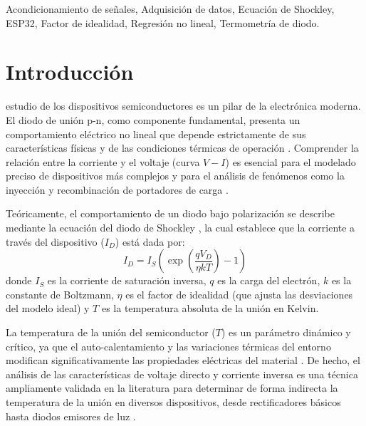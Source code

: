 \documentclass[conference]{IEEEtran}
\begin{document}
\renewcommand\IEEEkeywordsname{Palabras clave}\begin{keywords}
Acondicionamiento de señales, Adquisición de datos, Ecuación de Shockley, ESP32, Factor de idealidad, Regresión no lineal, Termometría de diodo.
\end{keywords}

\section{Introducción}
\label{sec:introduccion}

 estudio de los dispositivos semiconductores es un pilar de la electrónica moderna. El diodo de unión p-n, como componente fundamental, presenta un comportamiento eléctrico no lineal que depende estrictamente de sus características físicas y de las condiciones térmicas de operación \cite{boylestad_dispositivos, neamen_fisica_semiconductores}. Comprender la relación entre la corriente y el voltaje (curva $V-I$) es esencial para el modelado preciso de dispositivos más complejos y para el análisis de fenómenos como la inyección y recombinación de portadores de carga \cite{karg1997light, wilson1970comparison}.

Teóricamente, el comportamiento de un diodo bajo polarización se describe mediante la ecuación del diodo de Shockley \cite{vliet1980shockley, musolino2016modified}, la cual establece que la corriente a través del dispositivo ($I_D$) está dada por:
\begin{equation}
    I_D = I_S \left( \exp  \left( {\frac{q V_D}{\eta k T}}\right) - 1 \right)
    \label{eq:shockley}
\end{equation}
donde $I_S$ es la corriente de saturación inversa, $q$ es la carga del electrón, $k$ es la constante de Boltzmann, $\eta$ es el factor de idealidad (que ajusta las desviaciones del modelo ideal) y $T$ es la temperatura absoluta de la unión en Kelvin. 

La temperatura de la unión del semiconductor ($T$) es un parámetro dinámico y crítico, ya que el auto-calentamiento y las variaciones térmicas del entorno modifican significativamente las propiedades eléctricas del material \cite{oh2017junction, long2012numerical}. De hecho, el análisis de las características de voltaje directo y corriente inversa es una técnica ampliamente validada en la literatura para determinar de forma indirecta la temperatura de la unión en diversos dispositivos, desde rectificadores básicos hasta diodos emisores de luz \cite{wu2013junction, han2014influence}. 
\end{document}
